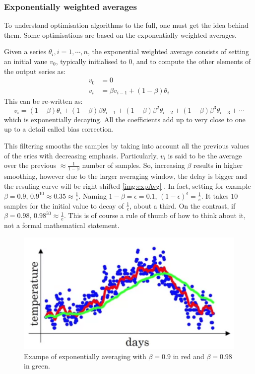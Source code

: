 \subsubsection{Exponentially weighted averages}
\label{subsubsec:ExpWeightedAvg}
To understand optimisation algorithms to the full, one must get the idea behind them. Some optimisations are based on the exponentially weighted averages.

Given a series $\theta_i, i=1,\cdots, n$, the exponential weighted average consists of setting an initial vaue $v_0$, typically initialised to $0$, and to compute the other elements of the output series as:
\begin{equation}
\begin{aligned}
v_0 &= 0\\
v_i &= \beta v_{i-1}+(1-\beta) \theta_i 
\end{aligned}
\end{equation}
This can be re-written as:
\begin{equation}
v_i = (1-\beta) \theta_i +  (1-\beta) \beta \theta_{i-1} + (1-\beta) \beta^2 \theta_{i-2} + (1-\beta) \beta^3 \theta_{i-3} + \cdots  
\end{equation}
which is exponentially decaying. All the coefficients add up to very close to one up to a detail called bias correction.

This filtering smooths the samples by taking into account all the previous values of the sries with decreasing emphasis. Particularly, $v_i$ is said to be the average over the previous $\approx \frac{1}{1-\beta}$ number of samples. So, increasing $\beta$ results in higher smoothing, however due to the larger averaging window, the delay is bigger and the resuling curve will be right-shifted \autoref{img:expAvg}	. In fact, setting for example $\beta=0.9$, $0.9^{10}\approx 0.35 \approx \frac{1}{e}$. Naming $1-\beta=\epsilon=0.1$, $(1-\epsilon)^\epsilon=\frac{1}{e}$. It takes $10$ samples for the initial value to decay of $\frac{1}{e}$, about a third. On the contrast, if $\beta=0.98$, $0.98^{50}\approx \frac{1}{e}$. This is of course a rule of thumb of how to think about it, not a formal mathematical statement.	

\begin{figure}
\includegraphics[scale=0.38]{img/expAvg}
\caption{Exampe of exponentially averaging with $\beta=0.9$ in red and $\beta=0.98$ in green.}
\label{img:expAg}
\end{figure}

